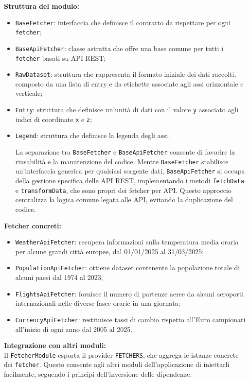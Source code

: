 \textbf{Struttura del modulo:}
\begin{itemize}
    \item \texttt{BaseFetcher}: interfaccia che definisce il contratto da rispettare per ogni \texttt{fetcher};
    \item \texttt{BaseApiFetcher}: classe astratta che offre una base comune per tutti i \texttt{fetcher} basati su API REST;
    \item \texttt{RawDataset}: struttura che rappresenta il formato iniziale dei dati raccolti, composto da una lista di entry e da etichette associate agli assi orizzontale e verticale;
    \item \texttt{Entry}: struttura che definisce un'unità di dati con il valore \texttt{y} associato agli indici di coordinate \texttt{x} e \texttt{z};
    \item \texttt{Legend}: struttura che definisce la legenda degli assi.
    
    La separazione tra \texttt{BaseFetcher} e \texttt{BaseApiFetcher} consente di favorire la riusabilità e la manutenzione del codice. Mentre \texttt{BaseFetcher} stabilisce un'interfaccia generica per qualsiasi sorgente dati, \texttt{BaseApiFetcher} si occupa della gestione specifica delle API REST, implementando i metodi \texttt{fetchData} e \texttt{transformData}, che sono propri dei fetcher per API. Questo approccio centralizza la logica comune legata alle API, evitando la duplicazione del codice.
    
\end{itemize}

\textbf{Fetcher concreti:}
\begin{itemize}
    \item \texttt{WeatherApiFetcher}: recupera informazioni sulla temperatura media oraria per alcune grandi città europee, dal 01/01/2025 al 31/03/2025;
    \item \texttt{PopulationApiFetcher}: ottiene dataset contenente la popolazione totale di alcuni paesi dal 1974 al 2023;
    \item \texttt{FlightsApiFetcher}: fornisce il numero di partenze aeree da alcuni aeroporti internazionali nelle diverse fasce orarie in una giornata;
    \item \texttt{CurrencyApiFetcher}: restituisce tassi di cambio rispetto all'Euro campionati all'inizio di ogni anno dal 2005 al 2025.
\end{itemize}

\textbf{Integrazione con altri moduli:} \\
Il \texttt{FetcherModule} esporta il provider \texttt{FETCHERS}, che aggrega le istanze concrete dei \texttt{fetcher}. Questo consente agli altri moduli dell’applicazione di iniettarli facilmente, seguendo i principi dell’inversione delle dipendenze.

